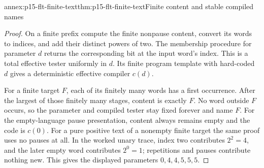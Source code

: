 \begin{annexitem}{annex:p15-flt-finite-text}{thm:p15-flt-finite-text}{Finite content and stable compiled names}
\begin{proof}
On a finite prefix compute the finite nonpause content,
convert its words to indices, and add their distinct
powers of two. The membership procedure for parameter
\(d\) returns the corresponding bit at the input word's
index. This is a total effective tester uniformly in \(d\).
Its finite program template with hard-coded \(d\) gives
a deterministic effective compiler \(c(d)\).

For a finite target \(F\), each of its finitely many words
has a first occurrence. After the largest of those finitely
many stages, content is exactly \(F\).
No word outside \(F\) occurs, so the parameter and compiled
tester stay fixed forever and name \(F\).
For the empty-language pause presentation, content always
remains empty and the code is \(c(0)\).
For a pure positive text of a nonempty finite target the
same proof uses no pauses at all.
In the worked unary trace, index two contributes \(2^2=4\),
and the later empty word contributes \(2^0=1\); repetitions
and pauses contribute nothing new. This gives the displayed
parameters \(0,4,4,5,5,5\).
\end{proof}
\end{annexitem}

